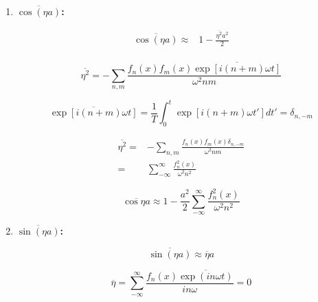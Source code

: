 \begin{enumerate}

\item  \textbf{ $\overline{\cos(\eta a)} $:}

    \begin{equation}\label{eq:B.22}
        \begin{split}
            \overline{\cos(\eta a)} \approx &1-\frac{\overline{\eta^2}a^2}{2}\\
        \end{split}
    \end{equation}

    \begin{equation}\label{eq:B.23}
        \overline{\eta^2}=-\sum_{n,m} \frac{f_n(x)f_m(x)\overline{\exp{[i(n+m)\omega t]}}}{\omega^2nm}    
    \end{equation}

    \begin{equation}\label{eq:B.24}
        \overline{\exp{[i(n+m)\omega t]}}=\frac{1}{T}\int^t_0 \exp{[i(n+m)\omega t']}dt'=\delta_{n,-m}
    \end{equation}

    \begin{equation}\label{eq:B.25}
        \begin{split}
            \overline{\eta^2}=&-\sum_{n,m}\frac{f_n(x)f_m(x)\delta_{n,-m}  }{\omega^2nm}\\
            =& \sum^{\infty}_{-\infty} \frac{f^2_n(x)}{\omega^2n^2}
        \end{split}
    \end{equation}

    \begin{equation}\label{eq:B.26}
            \overline{\cos{\eta a}} \approx 1-\frac{a^2}{2}\sum^{\infty}_{-\infty} \frac{f^2_n(x)}{\omega^2n^2}
    \end{equation}

\item  \textbf{ $\overline{\sin({\eta a})}$:}
    
    \begin{equation}\label{eq:B.27}
        \overline{\sin({\eta a})} \approx \overline{\eta} a
    \end{equation}

    \begin{equation}\label{eq:B.28}
        \overline{\eta}=\sum^{\infty}_{-\infty}\frac{f_n(x)\overline{\exp(in\omega t)}}{in\omega}=0
    \end{equation}


\end{enumerate}
